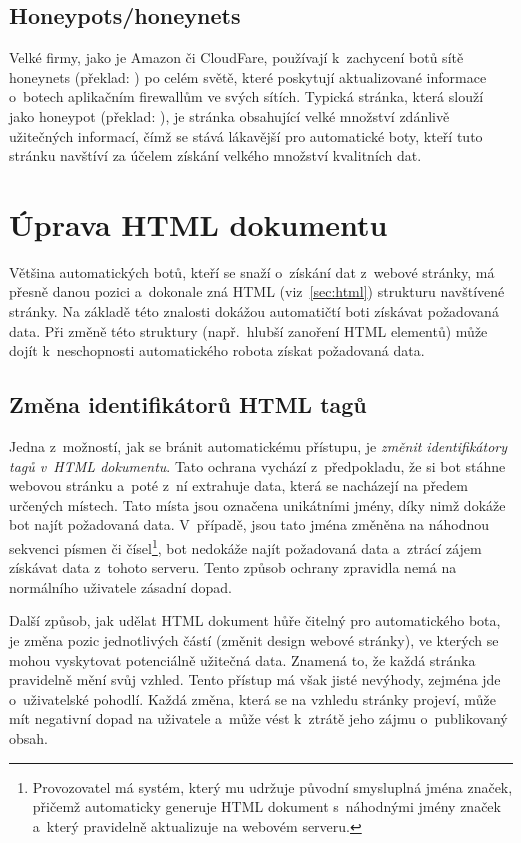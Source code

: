 \subsection*{Honeypots/honeynets}
Velké firmy, jako je Amazon či CloudFare, používají k~zachycení botů sítě honeynets (překlad:  \textit{}) po celém světě, které poskytují aktualizované informace o~botech aplikačním firewallům ve svých sítích. Typická stránka, která slouží jako honeypot (překlad:  \textit{}), je stránka obsahující velké množství zdánlivě užitečných informací, čímž se stává lákavější pro automatické boty, kteří tuto stránku navštíví za účelem získání velkého množství kvalitních dat. 

\section{Úprava HTML dokumentu}
Většina automatických botů, kteří se snaží o~získání dat z~webové stránky, má přesně danou pozici a~dokonale zná HTML (viz~\ref{sec:html}) strukturu navštívené stránky. Na základě této znalosti dokážou automatičtí boti získávat požadovaná data. Při změně této struktury (např.~hlubší zanoření HTML elementů) může dojít k~neschopnosti automatického robota získat požadovaná data.

\subsection*{Změna identifikátorů HTML tagů}
Jedna z~možností, jak se bránit automatickému přístupu, je \textit{změnit identifikátory tagů v~HTML dokumentu}. Tato ochrana vychází z~předpokladu, že si bot stáhne webovou stránku a~poté z~ní extrahuje data, která se nacházejí na předem určených místech. Tato místa jsou označena unikátními jmény, díky nimž dokáže bot najít požadovaná data. V~případě, jsou tato jména změněna na náhodnou sekvenci písmen či čísel\footnote{Provozovatel má systém, který mu udržuje původní smysluplná jména značek, přičemž automaticky generuje HTML dokument s~náhodnými jmény značek a~který pravidelně aktualizuje na webovém serveru.}, bot nedokáže najít požadovaná data a~ztrácí zájem získávat data z~tohoto serveru. Tento způsob ochrany zpravidla nemá na normálního uživatele zásadní dopad.

Další způsob, jak udělat HTML dokument hůře čitelný pro automatického bota, je změna pozic jednotlivých částí (změnit design webové stránky), ve kterých se mohou vyskytovat potenciálně užitečná data. Znamená to, že každá stránka pravidelně mění svůj vzhled. Tento přístup má však jisté nevýhody, zejména jde o~uživatelské pohodlí. Každá změna, která se na vzhledu stránky projeví, může mít negativní dopad na uživatele a~může vést k~ztrátě jeho zájmu o~publikovaný obsah.

